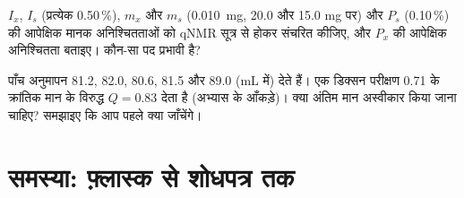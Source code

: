 \begin{exercise}[$\star\star\star$]\label{exo:b3:lab-techniques-3:11}
$I_x$, $I_s$ (प्रत्येक 0.50\,\%), $m_x$ और $m_s$ (\qty{0.010}{mg}, 20.0
और 15.0 mg पर) और $P_s$ (0.10\,\%) की आपेक्षिक मानक अनिश्चितताओं को qNMR सूत्र से होकर संचरित कीजिए, और $P_x$ की आपेक्षिक अनिश्चितता बताइए।
कौन-सा पद प्रभावी है?
\end{exercise}

\begin{exercise}[$\star\star\star$]\label{exo:b3:lab-techniques-3:12}
पाँच अनुमापन 81.2, 82.0, 80.6, 81.5 और 89.0 (mL में) देते हैं। एक डिक्सन परीक्षण
0.71 के क्रांतिक मान के विरुद्ध $Q = 0.83$ देता है (अभ्यास के आँकड़े)। क्या अंतिम मान
अस्वीकार किया जाना चाहिए? समझाइए कि आप पहले क्या जाँचेंगे।
\end{exercise}

\section{समस्या: फ़्लास्क से शोधपत्र तक}

